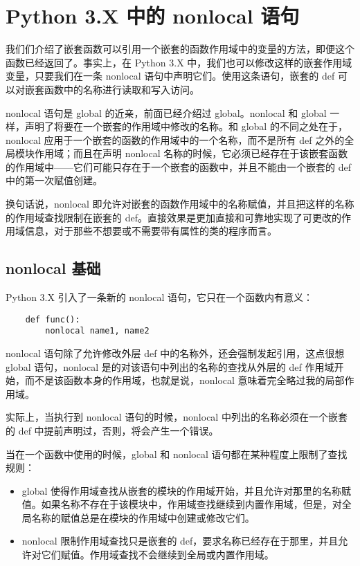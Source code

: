 \section{Python 3.X 中的 nonlocal 语句}
我们们介绍了嵌套函数可以引用一个嵌套的函数作用域中的变量的方法，即便这个函数已经返回了。事实上，在 Python 3.X 中，我们也可以修改这样的嵌套作用域变量，只要我们在一条 nonlocal 语句中声明它们。使用这条语句，嵌套的 def 可以对嵌套函数中的名称进行读取和写入访问。

nonlocal 语句是 global 的近亲，前面已经介绍过 global。nonlocal 和 global 一样，声明了将要在一个嵌套的作用域中修改的名称。和 global 的不同之处在于，nonlocal 应用于一个嵌套的函数的作用域中的一个名称，而不是所有 def 之外的全局模块作用域；而且在声明 nonlocal 名称的时候，它必须已经存在于该嵌套函数的作用域中——它们可能只存在于一个嵌套的函数中，并且不能由一个嵌套的 def 中的第一次赋值创建。

换句话说，nonlocal 即允许对嵌套的函数作用域中的名称赋值，并且把这样的名称的作用域查找限制在嵌套的 def。直接效果是更加直接和可靠地实现了可更改的作用域信息，对于那些不想要或不需要带有属性的类的程序而言。
\subsection{nonlocal 基础}
Python 3.X 引入了一条新的 nonlocal 语句，它只在一个函数内有意义：
\begin{verbatim}
    def func():
        nonlocal name1, name2
\end{verbatim}

nonlocal 语句除了允许修改外层 def 中的名称外，还会强制发起引用，这点很想 global 语句，nonlocal 是的对该语句中列出的名称的查找从外层的 def 作用域开始，而不是该函数本身的作用域，也就是说，nonlocal 意味着完全略过我的局部作用域。

实际上，当执行到 nonlocal 语句的时候，nonlocal 中列出的名称必须在一个嵌套的 def 中提前声明过，否则，将会产生一个错误。

当在一个函数中使用的时候，global 和 nonlocal 语句都在某种程度上限制了查找规则：
\begin{itemize}
    \item global 使得作用域查找从嵌套的模块的作用域开始，并且允许对那里的名称赋值。如果名称不存在于该模块中，作用域查找继续到内置作用域，但是，对全局名称的赋值总是在模块的作用域中创建或修改它们。
    \item nonlocal 限制作用域查找只是嵌套的 def，要求名称已经存在于那里，并且允许对它们赋值。作用域查找不会继续到全局或内置作用域。
\end{itemize}
